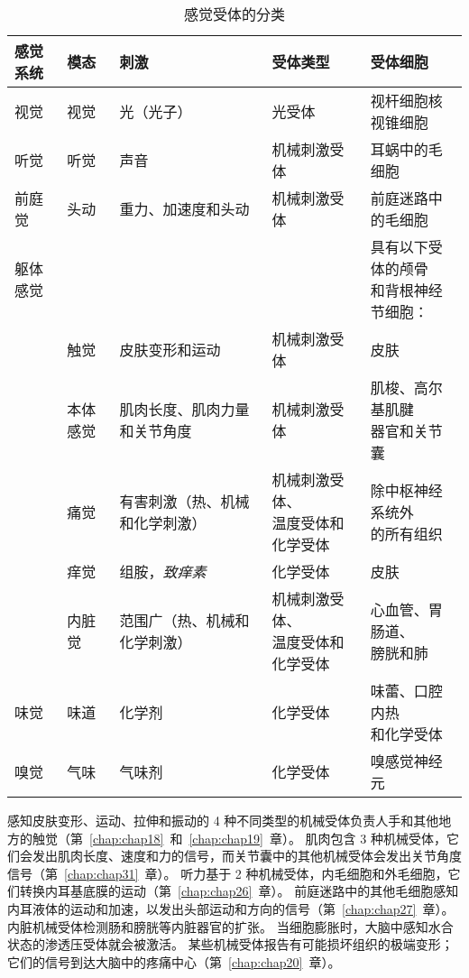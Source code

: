 \begin{table}[htbp]
	\centering
	\caption{感觉受体的分类}
	\begin{tabular}{lllll}
		\toprule
		感觉系统 & 模态 & 刺激 & 受体类型 & 受体细胞 \\
		\midrule
		视觉 & 视觉 & 光（光子）   & 光受体 & 视杆细胞核视锥细胞\\
		听觉 & 听觉 & 声音   & 机械刺激受体 & 耳蜗中的毛细胞 \\
		前庭觉 & 头动 & 重力、加速度和头动   & 机械刺激受体 & 前庭迷路中的毛细胞 \\
		躯体感觉 &  &   &  & \makecell[l]{具有以下受体的颅骨 \\ 和背根神经节细胞：} \\
		 & 触觉 & 皮肤变形和运动   & 机械刺激受体 & 皮肤 \\
		 & 本体感觉 & 肌肉长度、肌肉力量和关节角度   & 机械刺激受体 & \makecell[l]{肌梭、高尔基肌腱 \\ 器官和关节囊}  \\
		 & 痛觉 & 有害刺激（热、机械和化学刺激）  & \makecell[l]{机械刺激受体、 \\ 温度受体和化学受体}  & \makecell[l]{除中枢神经系统外 \\ 的所有组织}  \\
		 & 痒觉 & 组胺，\textit{致痒素}  & 化学受体 & 皮肤 \\
		 & 内脏觉 & 范围广（热、机械和化学刺激）  & \makecell[l]{机械刺激受体、 \\ 温度受体和化学受体} & \makecell[l]{心血管、胃肠道、 \\ 膀胱和肺}  \\
		味觉 & 味道 & 化学剂   & 化学受体 & \makecell[l]{味蕾、口腔内热 \\ 和化学受体}  \\
		嗅觉 & 气味 & 气味剂   & 化学受体 & 嗅感觉神经元 \\
		\bottomrule
	\end{tabular}%
	\label{tab:17_1}%
\end{table}%


感知皮肤变形、运动、拉伸和振动的 4 种不同类型的机械受体负责人手和其他地方的触觉（第~\ref{chap:chap18}~和~\ref{chap:chap19}~章）。
肌肉包含 3 种机械受体，它们会发出肌肉长度、速度和力的信号，而关节囊中的其他机械受体会发出关节角度信号（第~\ref{chap:chap31}~章）。
听力基于 2 种机械受体，内毛细胞和外毛细胞，它们转换内耳基底膜的运动（第~\ref{chap:chap26}~章）。
前庭迷路中的其他毛细胞感知内耳液体的运动和加速，以发出头部运动和方向的信号（第~\ref{chap:chap27}~章）。 
内脏机械受体检测肠和膀胱等内脏器官的扩张。 
当细胞膨胀时，大脑中感知水合状态的渗透压受体就会被激活。 
某些机械受体报告有可能损坏组织的极端变形； 
它们的信号到达大脑中的疼痛中心（第~\ref{chap:chap20}~章）。


